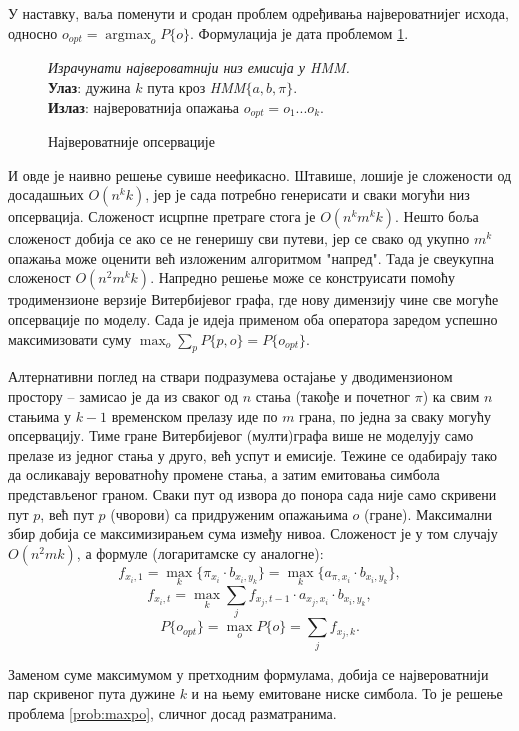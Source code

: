 \documentclass[12pt,oneside]{memoir}
\newenvironment{problem}[1][!ht]
{\renewcommand{\algorithmcfname}{Проблем}
\begin{figure}[!ht]
\centering
  \begin{minipage}{.94\linewidth}
	\begin{algorithm}[#1]%
  }{\end{algorithm}
  \end{minipage}
\end{figure}}
\begin{document}
\begin{CJK}{UTF8}{ipxm}
У наставку, ваља поменути и сродан проблем одређивања највероватнијег исхода, односно $o_{opt} = \operatorname{argmax}_o P\{o\}$. Формулација је дата проблемом \ref{prob:maxops}.

\begin{problem}[H]
  \SetAlgoLined
  \textit{Израчунати највероватнији низ емисија у \textit{HMM}.}\\
  \textbf{Улаз}: дужина $k$ пута кроз \textit{HMM}$\{a, b, \pi\}$.\\
  \textbf{Излаз}: највероватнија опажања $o_{opt} = o_1...o_k$.
  \caption{Највероватније опсервације}
  \label{prob:maxops}
\end{problem}

И овде је наивно решење сувише неефикасно. Штавише, лошије је сложености од досадашњих $O(n^k k)$, јер је сада потребно генерисати и сваки могући низ опсервација. Сложеност исцрпне претраге стога је $O(n^k m^k k)$. Нешто боља сложеност добија се ако се не генеришу сви путеви, јер се свако од укупно $m^k$ опажања може оценити већ изложеним алгоритмом "напред". Тада је свеукупна сложеност $O(n^2 m^k k)$. Напредно решење може се конструисати помоћу тродимензионе верзије Витербијевог графа\cite{compeau2015}, где нову димензију чине све могуће опсервације по моделу. Сада је идеја применом оба оператора заредом успешно максимизовати суму $\max_o \sum_p P\{p, o\} = P\{o_{opt}\}$.

Алтернативни поглед на ствари подразумева остајање у дводимензионом простору -- замисао је да из сваког од $n$ стања (такође и почетног $\pi$) ка свим $n$ стањима у $k-1$ временском прелазу иде по $m$ грана, по једна за сваку могућу опсервацију. Тиме гране Витербијевог (мулти)графа више не моделују само прелазе из једног стања у друго, већ успут и емисије. Тежине се одабирају тако да осликавају вероватноћу промене стања, а затим емитовања симбола представљеног граном. Сваки пут од извора до понора сада није само скривени пут $p$, већ пут $p$ (чворови) са придруженим опажањима $o$ (гране). Максимални збир добија се максимизирањем сума између нивоа. Сложеност је у том случају $O(n^2 m k)$, а формуле (логаритамске су аналогне): $$f_{x_i, 1} = \max_k \{\pi_{x_i} \cdot b_{x_i, y_k}\} = \max_k \{a_{\pi, x_i} \cdot b_{x_i, y_k}\},$$ $$f_{x_i, t} = \max_k \sum_j f_{x_j, t-1} \cdot a_{x_j, x_i} \cdot b_{x_i, y_k},$$ $$P\{o_{opt}\} = \max_o P\{o\} = \sum_j f_{x_j, k}.$$

Заменом суме максимумом у претходним формулама, добија се највероватнији пар скривеног пута дужине $k$ и на њему емитоване ниске симбола. То је решење проблема \ref{prob:maxpo}, сличног досад разматранима.


\end{CJK}
\end{document}
